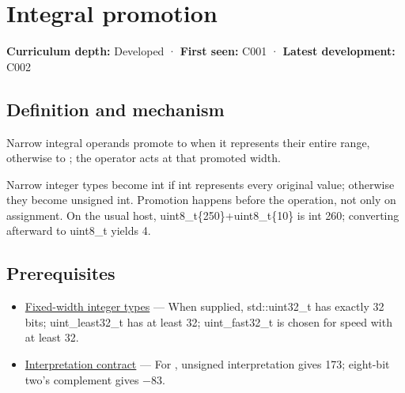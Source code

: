 \hypertarget{appendix-45303d03796a}{}\label{referencestart:appendix-45303d03796a}
\section{Integral promotion}\label{appendix-45303d03796a-integral-promotion}

\hypertarget{appendix-45303d03796a-integral-promotion}{}

\textbf{Curriculum depth:} Developed · \textbf{First seen:} C001 · \textbf{Latest development:} C002

\begin{allmightroledefinition}

\subsection{Definition and mechanism}\label{appendix-45303d03796a-definition-and-mechanism}

\hypertarget{appendix-45303d03796a-definition-and-mechanism}{}

Narrow integral operands promote to  when it represents their entire range, otherwise to ; the operator acts at that promoted width.

\end{allmightroledefinition}

Narrow integer types become int if int represents every original value; otherwise they become unsigned int. Promotion happens before the operation, not only on assignment. On the usual host, uint8\_t\{250\}+uint8\_t\{10\} is int 260; converting afterward to uint8\_t yields 4.

\subsection{Prerequisites}\label{appendix-45303d03796a-prerequisites}

\hypertarget{appendix-45303d03796a-prerequisites}{}

\begin{itemize}
\tightlist
\item
  \hyperref[appendix-cc04044b5782]{Fixed-width integer types} --- When supplied, std::uint32\_t has exactly 32 bits; uint\_least32\_t has at least 32; uint\_fast32\_t is chosen for speed with at least 32.
\item
  \hyperref[appendix-f414bd4ed05c]{Interpretation contract} --- For , unsigned interpretation gives 173; eight-bit two's complement gives −83.
\end{itemize}

